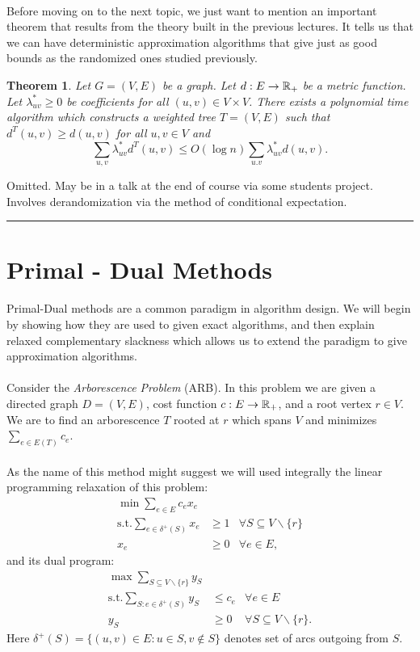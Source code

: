 \documentclass[letterpaper,12pt,oneside,onecolumn]{article}
\newenvironment{proof}{{\bf Proof:  }}{\hfill\rule{2mm}{2mm}}
\newtheorem{theorem}[fact]{Theorem}
\begin{document}
\paragraph{}
Before moving on to the next topic, we just want to mention an important theorem that results from the theory built in the previous lectures. It tells us that we can have deterministic approximation algorithms that give just as good bounds as the randomized ones studied previously.
\begin{theorem}
Let $G=(V,E)$ be a graph. Let $d: E \rightarrow \mathbb{R}_+$ be a metric function. Let $\lambda^*_{uv} \geq 0$ be coefficients for all $(u,v) \in V\times V$. There exists a polynomial time algorithm which constructs a weighted tree $T=(V,E)$ such that $d^T(u,v) \geq d(u,v)$ for all $u,v\in V$ and $$\sum_{u,v} \lambda^*_{uv}d^T(u,v) \leq O(\log n) \sum_{u.v} \lambda^*_{uv} d(u,v).$$
\end{theorem}
\begin{proof}
Omitted. May be in a talk at the end of course via some students project. Involves derandomization via the method of conditional expectation.
\end{proof}
\section{Primal - Dual Methods}
\paragraph{}
Primal-Dual methods are a common paradigm in algorithm design. We will begin by showing how they are used to given exact algorithms, and then explain relaxed complementary slackness which allows us to extend the paradigm to give approximation algorithms.
\paragraph{}
Consider the {\it Arborescence Problem} (ARB). In this problem we are given a directed graph $D= (V,E)$, cost function $c: E \rightarrow \mathbb{R}_+$, and a root vertex $r \in V$. We are to find an arborescence $T$ rooted at $r$ which spans $V$ and minimizes $\sum_{e\in E(T)} c_e$.
\paragraph{}
As the name of this method might suggest we will used integrally the linear programming relaxation of this problem:
\begin{align*}
\min \sum_{e \in E} c_e x_e  &\ \\
\text{s.t.} \sum_{e \in \delta^+(S)} x_e &\geq 1 &\forall S \subseteq V\backslash\{r\} \\
x_e &\geq 0 &\forall e \in E,
\end{align*}
and its dual program:
\begin{align*}
\max \sum_{S \subseteq V\backslash\{r\}} y_S &\ \\
\text{s.t.} \sum_{S : e \in \delta^+(S)} y_S &\leq c_e &\forall e \in E \\
y_S &\geq 0 &\forall S \subseteq V\backslash \{r\}.
\end{align*}
Here $\delta^+(S) = \{(u,v) \in E : u \in S, v\not\in S\}$ denotes set of arcs outgoing from $S$.
\end{document}
